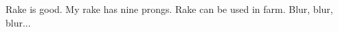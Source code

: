 \begin{englishabstract}
Rake is good. My rake has nine prongs. Rake can be used in farm. Blur, blur, blur...

\end{englishabstract}
